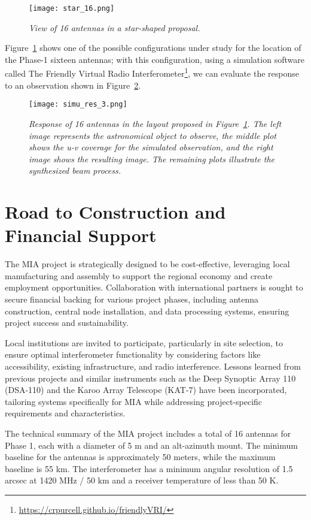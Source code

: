 \documentclass[baaa]{baaa}
\begin{document}
\begin{figure}[!t]
  \texttt{[image: star\_16.png]}
  \caption{\emph{View of 16 antennas in a star-shaped proposal.}}
  \label{fig:16-ant}
\end{figure}

Figure~\ref{fig:16-ant} shows one of the possible configurations under study for the location of the Phase-1 sixteen antennas; with this configuration, using a simulation software called The Friendly Virtual Radio Interferometer\footnote{\url{https://crpurcell.github.io/friendlyVRI/}}, we can evaluate the response to an observation shown in Figure~\ref{fig:sim16}.

\begin{figure}[!t]
  \texttt{[image: simu\_res\_3.png]}
  \caption{\emph{Response of 16 antennas in the layout proposed in Figure~\ref{fig:16-ant}. The left image represents the astronomical object to observe, the middle plot shows the u-v coverage for the simulated observation, and the right image shows the resulting image. The remaining plots illustrate the synthesized beam process.}}
  \label{fig:sim16}
\end{figure}


\section{Road to Construction and Financial Support}
\label{sec:construction}

The MIA project is strategically designed to be cost-effective, leveraging local manufacturing and assembly to support the regional economy and create employment opportunities. Collaboration with international partners is sought to secure financial backing for various project phases, including antenna construction, central node installation, and data processing systems, ensuring project success and sustainability.

Local institutions are invited to participate, particularly in site selection, to ensure optimal interferometer functionality by considering factors like accessibility, existing infrastructure, and radio interference. Lessons learned from previous projects and similar instruments such as the Deep Synoptic Array 110 (DSA-110) and the Karoo Array Telescope (KAT-7) have been incorporated, tailoring systems specifically for MIA while addressing project-specific requirements and characteristics.

The technical summary of the MIA project includes a total of 16 antennas for Phase 1, each with a diameter of 5 m and an alt-azimuth mount. The minimum baseline for the antennas is approximately 50 meters, while the maximum baseline is 55 km. The interferometer has a minimum angular resolution of 1.5 arcsec at 1420 MHz / 50 km and a receiver temperature of less than 50 K.
\end{document}
